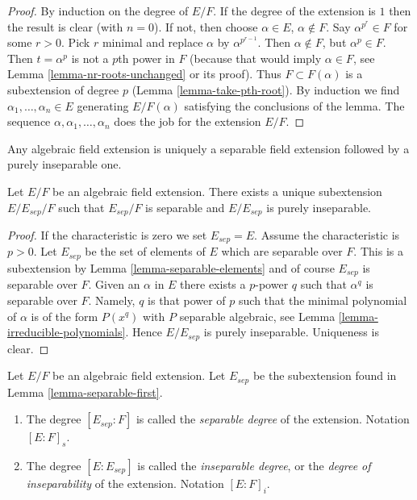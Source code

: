 \begin{proof}
By induction on the degree of $E/F$. If the degree of the extension is $1$
then the result is clear (with $n = 0$). If not, then choose
$\alpha \in E$, $\alpha \not \in F$. Say $\alpha^{p^r} \in F$ for some
$r > 0$. Pick $r$ minimal and replace $\alpha$ by $\alpha^{p^{r - 1}}$.
Then $\alpha \not \in F$, but $\alpha^p \in F$. Then $t = \alpha^p$ is not
a $p$th power in $F$ (because that would imply $\alpha \in F$, see
Lemma \ref{lemma-nr-roots-unchanged} or its proof).
Thus $F \subset F(\alpha)$ is a subextension of degree $p$
(Lemma \ref{lemma-take-pth-root}). By induction we find
$\alpha_1, \ldots, \alpha_n \in E$ generating $E/F(\alpha)$
satisfying the conclusions of the lemma.
The sequence $\alpha, \alpha_1, \ldots, \alpha_n$ does the job
for the extension $E/F$.
\end{proof}

\begin{lemma}
\label{lemma-separable-first}
\begin{slogan}
Any algebraic field extension is uniquely a separable field extension
followed by a purely inseparable one.
\end{slogan}
Let $E/F$ be an algebraic field extension. There exists a unique subextension
$E/E_{sep}/F$ such that $E_{sep}/F$ is separable and $E/E_{sep}$ is
purely inseparable.
\end{lemma}

\begin{proof}
If the characteristic is zero we set $E_{sep} = E$. Assume the characteristic
is $p > 0$. Let $E_{sep}$ be the set of elements of $E$ which are separable
over $F$. This is a subextension by Lemma \ref{lemma-separable-elements}
and of course $E_{sep}$ is separable over $F$. Given an $\alpha$ in $E$
there exists a $p$-power $q$ such that $\alpha^q$ is separable over $F$.
Namely, $q$ is that power of $p$ such that the minimal polynomial of
$\alpha$ is of the form $P(x^q)$ with $P$ separable algebraic, see
Lemma \ref{lemma-irreducible-polynomials}. Hence $E/E_{sep}$ is purely
inseparable. Uniqueness is clear.
\end{proof}

\begin{definition}
\label{definition-insep-degree}
Let $E/F$ be an algebraic field extension. Let $E_{sep}$ be the subextension
found in Lemma \ref{lemma-separable-first}.
\begin{enumerate}
\item The degree $[E_{sep} : F]$ is called the {\it separable
degree} of the extension. Notation $[E : F]_s$.
\item The degree $[E : E_{sep}]$ is called the {\it inseparable
degree}, or the {\it degree of inseparability} of the extension.
Notation $[E : F]_i$.
\end{enumerate}
\end{definition}

